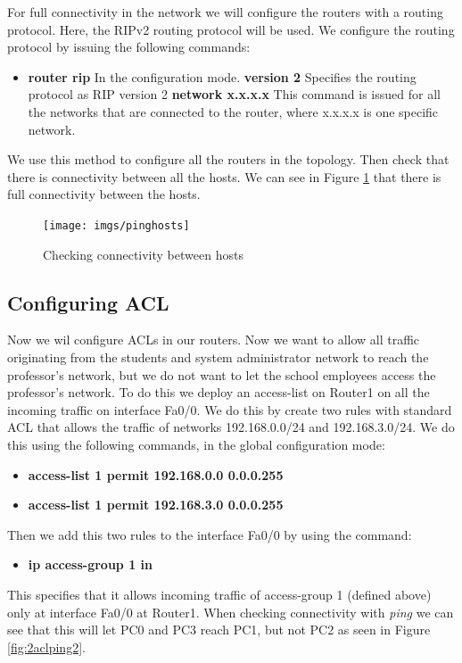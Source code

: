 \documentclass{article}
\begin{document}
For full connectivity in the network we will configure the routers with a routing protocol. Here, the RIPv2 routing protocol will be used. We configure the routing protocol by issuing the following commands:
\begin{itemize}
    \item \textbf{router rip} In the configuration mode.
    \subitem \textbf{version 2} Specifies the routing protocol as RIP version 2
    \subitem \textbf{network x.x.x.x} This command is issued for all the networks that are connected to the router, where x.x.x.x is one specific network.
\end{itemize}


We use this method to configure all the routers in the topology. Then check that there is connectivity between all the hosts. We can see in Figure \ref{fig:pinghosts} that there is full connectivity between the hosts. 

\begin{figure}[h]
\centering
\texttt{[image: imgs/pinghosts]}
\caption{Checking connectivity between hosts}
\label{fig:pinghosts}
\end{figure}

\subsection{Configuring ACL}

Now we wil configure ACLs in our routers. Now we want to allow all traffic originating from the students and system administrator network to reach the professor's network, but we do not want to let the school employees access the professor's network. To do this we deploy an access-list on Router1 on all the incoming traffic on interface Fa0/0. We do this by create two rules with standard ACL that allows the traffic of networks 192.168.0.0/24 and 192.168.3.0/24. We do this using the following commands, in the global configuration mode: 
\begin{itemize}
\item \textbf{access-list 1 permit 192.168.0.0 0.0.0.255}
\item \textbf{access-list 1 permit 192.168.3.0 0.0.0.255}
\end{itemize}
Then we add this two rules to the interface Fa0/0 by using the command:\\
\begin{itemize}
\item \textbf{ip access-group 1 in}
\end{itemize}
This specifies that it allows incoming traffic of access-group 1 (defined above) only at interface Fa0/0 at Router1. When checking connectivity with \textit{ping} we can see that this will let PC0 and PC3 reach PC1, but not PC2 as seen in Figure \ref{fig:2aclping2}.
\end{document}
